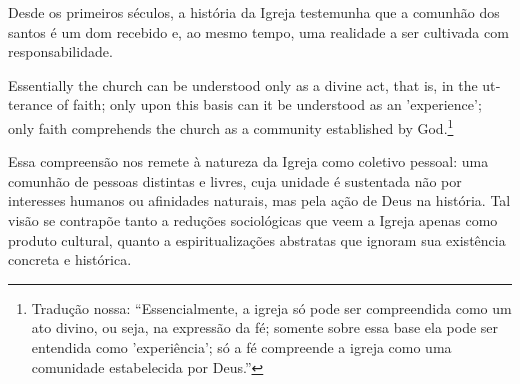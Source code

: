 Desde os primeiros séculos, a história da Igreja testemunha que a comunhão dos santos é um dom recebido e, ao mesmo tempo, uma realidade a ser cultivada com responsabilidade.

\begin{citacao}
\foreignlanguage{english}{Essentially the church can be understood only as a divine act, that is, in the utterance of faith; only upon this basis can it be understood as an 'experience'; only faith comprehends the church as a community established by God.}\footnote{Tradução nossa: ``Essencialmente, a igreja só pode ser compreendida como um ato divino, ou seja, na expressão da fé; somente sobre essa base ela pode ser entendida como 'experiência'; só a fé compreende a igreja como uma comunidade estabelecida por Deus.''} \cite[p.~195]{bonhoeffer1963}
\end{citacao}

Essa compreensão nos remete à natureza da Igreja como coletivo pessoal: uma comunhão de pessoas distintas e livres, cuja unidade é sustentada não por interesses humanos ou afinidades naturais, mas pela ação de Deus na história. Tal visão se contrapõe tanto a reduções sociológicas que veem a Igreja apenas como produto cultural, quanto a espiritualizações abstratas que ignoram sua existência concreta e histórica.
